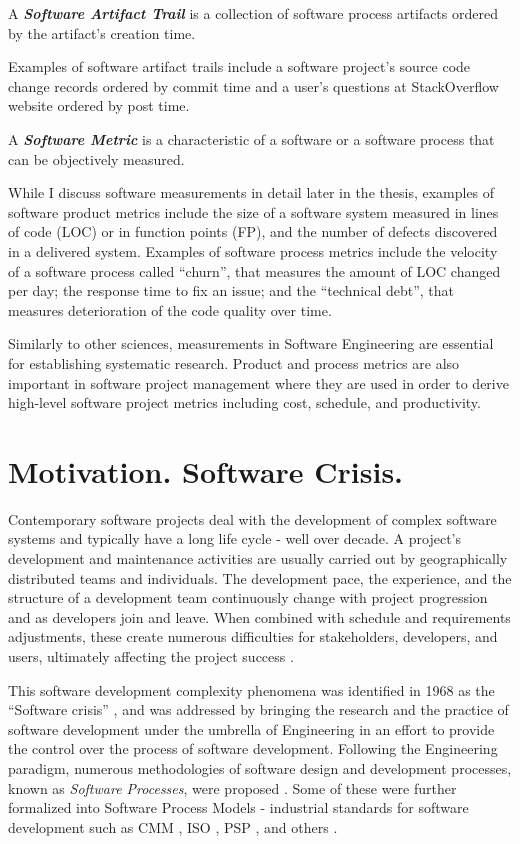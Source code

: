 \begin{defn}\label{def_artifact_trail}
A \textbf{\textit{Software Artifact Trail}} is a collection of software process artifacts ordered by the 
artifact's creation time.
\end{defn}
Examples of software artifact trails include a software project's source code change records ordered by 
commit time and a user's questions at StackOverflow website ordered by post time.

\begin{defn}\label{def_metric}
A \textbf{\textit{Software Metric}} is a characteristic of a software or a software process that can be 
objectively measured. 
\end{defn}
While I discuss software measurements in detail later in the thesis, examples of software product metrics include 
the size of a software system measured in lines of code (LOC) or in function points (FP), and the number of 
defects discovered in a delivered system. 
Examples of software process metrics include the velocity of a software process called ``churn'', that 
measures the amount of LOC changed per day; the response time to fix an issue; and the ``technical debt'', 
that measures deterioration of the code quality over time. 

Similarly to other sciences, measurements in Software Engineering are essential for establishing systematic 
research. Product and process metrics are also important in software project management where they are 
used in order to derive high-level software project metrics including cost, schedule, and productivity.

%
%
\section{Motivation. Software Crisis.}\label{section_background}
Contemporary software projects deal with the development of complex software systems and typically have 
a long life cycle - well over decade.
A project's development and maintenance activities are usually carried out by geographically 
distributed teams and individuals. The development pace, the experience, and the structure of a 
development team continuously change with project progression and as developers join and leave. 
When combined with schedule and requirements adjustments, these create numerous difficulties 
for stakeholders, developers, and users, ultimately affecting the project success \cite{citeulike:2207657}. 

This software development complexity phenomena was identified in 1968 as the ``Software crisis'' 
\cite{naur_crisis_68}, and was addressed by bringing the research and the practice of software 
development under the umbrella of Engineering in an effort to provide the control over the process 
of software development. 
Following the Engineering paradigm, numerous methodologies of software design and development 
processes, known as \textit{Software Processes}, were proposed \cite{citeulike:10002165}.
Some of these were further formalized into Software Process Models - industrial standards for software 
development such as CMM \cite{citeulike:9962021}, ISO \cite{iso-standard}, 
PSP \cite{citeulike:8347315}, and others \cite{citeulike:5043104}. 

